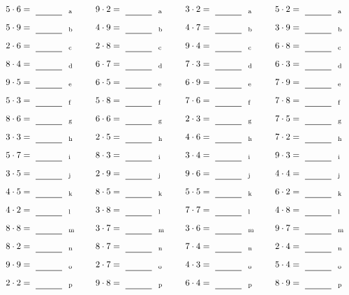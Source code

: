 \documentclass
[
  draft    = true,
  fontsize = 11pt,
  parskip  = half-
]
{scrartcl}
\begin{document}
\par\vfill\par
\begin{align*}
    \pline{5\cdot6}&=\rline{a}
  & \pline{9\cdot2}&=\rline{a}
  & \pline{3\cdot2}&=\rline{a}
  & \pline{5\cdot2}&=\rline{a} \\[1ex]
    \pline{5\cdot9}&=\rline{b}
  & \pline{4\cdot9}&=\rline{b}
  & \pline{4\cdot7}&=\rline{b}
  & \pline{3\cdot9}&=\rline{b} \\[1ex]
    \pline{2\cdot6}&=\rline{c}
  & \pline{2\cdot8}&=\rline{c}
  & \pline{9\cdot4}&=\rline{c}
  & \pline{6\cdot8}&=\rline{c} \\[1ex]
    \pline{8\cdot4}&=\rline{d}
  & \pline{6\cdot7}&=\rline{d}
  & \pline{7\cdot3}&=\rline{d}
  & \pline{6\cdot3}&=\rline{d} \\[1ex]
    \pline{9\cdot5}&=\rline{e}
  & \pline{6\cdot5}&=\rline{e}
  & \pline{6\cdot9}&=\rline{e}
  & \pline{7\cdot9}&=\rline{e} \\[1ex]
    \pline{5\cdot3}&=\rline{f}
  & \pline{5\cdot8}&=\rline{f}
  & \pline{7\cdot6}&=\rline{f}
  & \pline{7\cdot8}&=\rline{f} \\[1ex]
    \pline{8\cdot6}&=\rline{g}
  & \pline{6\cdot6}&=\rline{g}
  & \pline{2\cdot3}&=\rline{g}
  & \pline{7\cdot5}&=\rline{g} \\[1ex]
    \pline{3\cdot3}&=\rline{h}
  & \pline{2\cdot5}&=\rline{h}
  & \pline{4\cdot6}&=\rline{h}
  & \pline{7\cdot2}&=\rline{h} \\[1ex]
    \pline{5\cdot7}&=\rline{i}
  & \pline{8\cdot3}&=\rline{i}
  & \pline{3\cdot4}&=\rline{i}
  & \pline{9\cdot3}&=\rline{i} \\[1ex]
    \pline{3\cdot5}&=\rline{j}
  & \pline{2\cdot9}&=\rline{j}
  & \pline{9\cdot6}&=\rline{j}
  & \pline{4\cdot4}&=\rline{j} \\[1ex]
    \pline{4\cdot5}&=\rline{k}
  & \pline{8\cdot5}&=\rline{k}
  & \pline{5\cdot5}&=\rline{k}
  & \pline{6\cdot2}&=\rline{k} \\[1ex]
    \pline{4\cdot2}&=\rline{l}
  & \pline{3\cdot8}&=\rline{l}
  & \pline{7\cdot7}&=\rline{l}
  & \pline{4\cdot8}&=\rline{l} \\[1ex]
    \pline{8\cdot8}&=\rline{m}
  & \pline{3\cdot7}&=\rline{m}
  & \pline{3\cdot6}&=\rline{m}
  & \pline{9\cdot7}&=\rline{m} \\[1ex]
    \pline{8\cdot2}&=\rline{n}
  & \pline{8\cdot7}&=\rline{n}
  & \pline{7\cdot4}&=\rline{n}
  & \pline{2\cdot4}&=\rline{n} \\[1ex]
    \pline{9\cdot9}&=\rline{o}
  & \pline{2\cdot7}&=\rline{o}
  & \pline{4\cdot3}&=\rline{o}
  & \pline{5\cdot4}&=\rline{o} \\[1ex]
    \pline{2\cdot2}&=\rline{p}
  & \pline{9\cdot8}&=\rline{p}
  & \pline{6\cdot4}&=\rline{p}
  & \pline{8\cdot9}&=\rline{p}
\end{align*}
\end{document}
